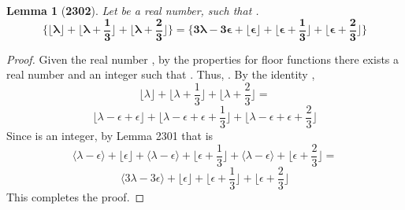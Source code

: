 \documentclass[preview]{standalone}
\newtheorem{lemma}{Lemma}
\begin{document}
\begin{lemma}[\textbf{2302}]
    Let \bm{$\lambda$} be a real number, 
    such that \bm{$\big \lfloor \lambda \big \rfloor + \epsilon = \lambda$}.
    \begin{equation*}
        \bm{
            \Bigg\{
                \bigg \lfloor \lambda \bigg \rfloor 
                    + 
                \bigg \lfloor \lambda + \frac{1}{3} \bigg \rfloor 
                    + 
                \bigg \lfloor \lambda + \frac{2}{3} \bigg \rfloor
            \Bigg\}
                =
            \Bigg\{
                3 \lambda - 3 \epsilon 
                    +
                \bigg \lfloor \epsilon \bigg \rfloor 
                    +
                \bigg \lfloor \epsilon + \frac{1}{3} \bigg \rfloor
                    +
                \bigg \lfloor \epsilon + \frac{2}{3} \bigg \rfloor            
            \Bigg\}
        }
    \end{equation*}
\end{lemma}

\begin{proof}
    Given the real number \bm{$\lambda$}, 
    by the properties for floor functions
    there exists a real number \bm{$\epsilon$}
    and an integer \bm{$\lambda - \epsilon$} such that 
    \bm{$\lfloor \lambda \rfloor = \lambda - \epsilon$}.
    Thus, \bm{$\lambda = \lambda - \epsilon + \epsilon$}.
    By the identity \bm{$\lambda$},
    \begin{equation*}
        \bigg \lfloor \lambda \bigg \rfloor 
            + 
        \bigg \lfloor \lambda + \frac{1}{3} \bigg \rfloor 
            + 
        \bigg \lfloor \lambda + \frac{2}{3} \bigg \rfloor
            =
    \end{equation*}
    \begin{equation*}
        \bigg \lfloor \lambda - \epsilon + \epsilon \bigg \rfloor 
            + 
        \bigg \lfloor \lambda - \epsilon + \epsilon + \frac{1}{3} \bigg \rfloor 
            + 
        \bigg \lfloor \lambda - \epsilon + \epsilon + \frac{2}{3} \bigg \rfloor
    \end{equation*}
    Since \bm{$\lambda - \epsilon$} is an integer, by Lemma 2301 that is
    \begin{equation*}
        \bigg \langle \lambda - \epsilon \bigg \rangle + \bigg \lfloor \epsilon \bigg \rfloor 
            + 
        \bigg \langle \lambda - \epsilon \bigg \rangle + \bigg \lfloor \epsilon + \frac{1}{3} \bigg \rfloor 
            + 
        \bigg \langle \lambda - \epsilon \bigg \rangle + \bigg \lfloor \epsilon + \frac{2}{3} \bigg \rfloor
            =
    \end{equation*}
    \begin{equation*}
        \bigg \langle 3 \lambda - 3 \epsilon \bigg \rangle
            + 
        \bigg \lfloor \epsilon \bigg \rfloor 
            + 
        \bigg \lfloor \epsilon + \frac{1}{3} \bigg \rfloor 
            + 
        \bigg \lfloor \epsilon + \frac{2}{3} \bigg \rfloor
    \end{equation*}
    This completes the proof.
\end{proof}
\end{document}
